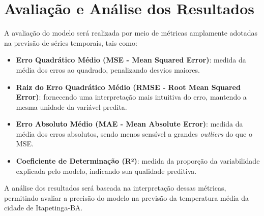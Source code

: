 \section{Avaliação e Análise dos Resultados}

    A avaliação do modelo será realizada por meio de métricas amplamente adotadas na previsão de 
    séries temporais, tais como: 
    \begin{itemize} 
        \item \textbf{Erro Quadrático Médio (MSE - Mean Squared Error)}: medida da média dos erros ao quadrado, 
        penalizando desvios maiores.
        \item \textbf{Raiz do Erro Quadrático Médio (RMSE - Root Mean Squared Error)}: fornecendo uma 
        interpretação mais intuitiva do erro, mantendo a mesma unidade da variável predita. 
        \item \textbf{Erro Absoluto Médio (MAE - Mean Absolute Error)}: medida da média dos erros absolutos, 
        sendo menos sensível a grandes \emph{outliers} do que o MSE. 
        \item \textbf{Coeficiente de Determinação (R²)}: medida da proporção da variabilidade explicada 
        pelo modelo, indicando sua qualidade preditiva. 
    \end{itemize}

    A análise dos resultados será baseada na interpretação dessas métricas, permitindo avaliar a precisão 
    do modelo na previsão da temperatura média da cidade de Itapetinga-BA.
